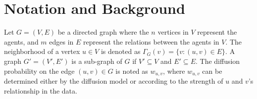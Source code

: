 \documentclass[10pt,journal,compsoc]{IEEEtran}
\begin{document}
\section{Notation and Background}\label{sec:background}

Let $G = (V,E)$ be a directed graph where the $n$ vertices in $V$ represent the agents, and $m$ edges in $E$ represent the relations between the agents in $V$.
The neighborhood of a vertex $u \in V$ is denoted as $\Gamma_{G}(v) = \{v: (u,v) \in E\}$. 
A graph $G' = (V',E')$ is a sub-graph of $G$ if $V' \subseteq V$ and $E' \subseteq E$. The diffusion probability on the edge $(u, v) \in G$ is noted as $w_{u,v}$, where $w_{u,v}$ can be determined either by the diffusion model or according to the strength of $u$ and $v$'s relationship in the data.
\end{document}
